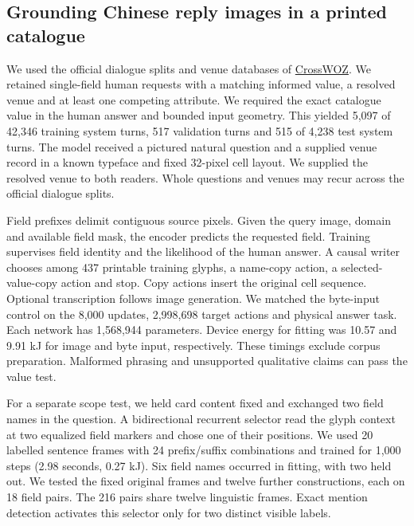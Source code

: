 \subsection*{Grounding Chinese reply images in a printed catalogue}
We used the official dialogue splits and venue databases of \href{https://github.com/thu-coai/CrossWOZ}{CrossWOZ}. We retained single-field human requests with a matching informed value, a resolved venue and at least one competing attribute. We required the exact catalogue value in the human answer and bounded input geometry. This yielded 5,097 of 42,346 training system turns, 517 validation turns and 515 of 4,238 test system turns. The model received a pictured natural question and a supplied venue record in a known typeface and fixed 32-pixel cell layout. We supplied the resolved venue to both readers. Whole questions and venues may recur across the official dialogue splits.

Field prefixes delimit contiguous source pixels. Given the query image, domain and available field mask, the encoder predicts the requested field. Training supervises field identity and the likelihood of the human answer. A causal writer chooses among 437 printable training glyphs, a name-copy action, a selected-value-copy action and stop. Copy actions insert the original cell sequence. Optional transcription follows image generation. We matched the byte-input control on the 8,000 updates, 2,998,698 target actions and physical answer task. Each network has 1,568,944 parameters. Device energy for fitting was 10.57 and 9.91 kJ for image and byte input, respectively. These timings exclude corpus preparation. Malformed phrasing and unsupported qualitative claims can pass the value test.

For a separate scope test, we held card content fixed and exchanged two field names in the question. A bidirectional recurrent selector read the glyph context at two equalized field markers and chose one of their positions. We used 20 labelled sentence frames with 24 prefix/suffix combinations and trained for 1,000 steps (2.98 seconds, 0.27 kJ). Six field names occurred in fitting, with two held out. We tested the fixed original frames and twelve further constructions, each on 18 field pairs. The 216 pairs share twelve linguistic frames. Exact mention detection activates this selector only for two distinct visible labels.
